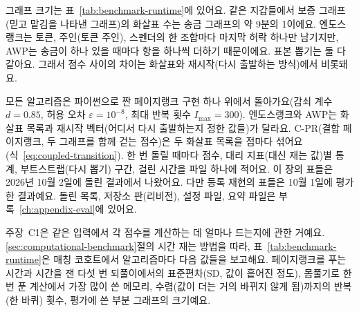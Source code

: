 그래프 크기는 표~\ref{tab:benchmark-runtime}에 있어요. 같은 지갑들에서 보증 그래프(믿고 맡김을 나타낸 그래프)의 화살표 수는 송금 그래프의 약 9분의 1이에요. 엔도스랭크는 토큰, 주인(토큰 주인), 스펜더의 한 조합마다 마지막 허락 하나만 남기지만, AWP는 송금이 하나 있을 때마다 항을 하나씩 더하기 때문이에요. 표본 뽑기는 둘 다 같아요. 그래서 점수 사이의 차이는 화살표와 재시작(다시 출발하는 방식)에서 비롯돼요.


모든 알고리즘은 파이썬으로 짠 페이지랭크 구현 하나 위에서 돌아가요(감쇠 계수 $d=0.85$, 허용 오차 $\varepsilon=10^{-8}$, 최대 반복 횟수 $I_{\max}=300$). 엔도스랭크와 AWP는 화살표 목록과 재시작 벡터(어디서 다시 출발하는지 정한 값들)가 달라요. C-PR(결합 페이지랭크, 두 그래프를 함께 걷는 점수)은 두 화살표 목록을 점마다 섞어요(식~\eqref{eq:coupled-transition}). 한 번 돌릴 때마다 점수, 대리 지표(대신 재는 값)별 통계, 부트스트랩(다시 뽑기) 구간, 걸린 시간을 파일 하나에 적어요. 이 장의 표들은 2026년 10월 2일에 돌린 결과에서 나왔어요. 다만 등록 재현의 표들은 10월 1일에 평가한 결과예요. 돌린 목록, 저장소 판(리비전), 설정 파일, 요약 파일은 부록~\ref{ch:appendix-eval}에 있어요.


주장~C1은 같은 입력에서 각 점수를 계산하는 데 얼마나 드는지에 관한 거예요. \ref{sec:computational-benchmark}절의 시간 재는 방법을 따라, 표~\ref{tab:benchmark-runtime}은 매칭 코호트에서 알고리즘마다 다음 값들을 보고해요. 페이지랭크를 푸는 시간과 시간을 잰 다섯 번 되풀이에서의 표준편차(SD, 값이 흩어진 정도), 몸풀기로 한 번 푼 계산에서 가장 많이 쓴 메모리, 수렴(값이 더는 거의 바뀌지 않게 됨)까지의 반복(한 바퀴) 횟수, 평가에 쓴 부분 그래프의 크기예요.



